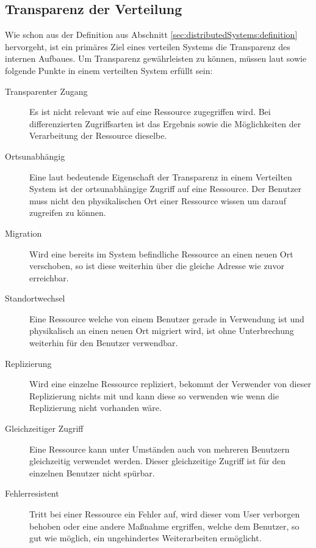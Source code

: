\subsection{Transparenz der Verteilung}\label{sec:distributedSystems:goales:Transperency} Wie schon aus der Definition aus Abschnitt \ref{sec:distributedSystems:definition} hervorgeht, ist ein primäres Ziel eines verteilen Systems die Transparenz des internen Aufbaues. Um Transparenz gewährleisten zu können, müssen laut \cite{iec1995open} sowie \cite{tanenbaum2007distributed} folgende Punkte in einem verteilten System erfüllt sein:
\begin{description}
    \item[Transparenter Zugang] Es ist nicht relevant wie auf eine Ressource zugegriffen wird. Bei differenzierten Zugriffsarten ist das Ergebnis sowie die Möglichkeiten der Verarbeitung der Ressource dieselbe. 
    \item[Ortsunabhängig] Eine laut \cite{tanenbaum2007distributed} bedeutende Eigenschaft der Transparenz in einem Verteilten System ist der ortsunabhängige Zugriff auf eine Ressource. Der Benutzer muss nicht den physikalischen Ort einer Ressource wissen um darauf zugreifen zu können. 
    \item[Migration] Wird eine bereits im System befindliche Ressource an einen neuen Ort verschoben, so ist diese weiterhin über die gleiche Adresse wie zuvor erreichbar.
    \item [Standortwechsel] Eine Ressource welche von einem Benutzer gerade in Verwendung ist und physikalisch an einen neuen Ort migriert wird, ist ohne Unterbrechung weiterhin für den Benutzer verwendbar.
    \item[Replizierung] Wird eine einzelne Ressource repliziert, bekommt der Verwender von dieser Replizierung nichts mit und kann diese so verwenden wie wenn die Replizierung nicht vorhanden wäre. 
    \item[Gleichzeitiger Zugriff] Eine Ressource kann unter Umständen auch von mehreren Benutzern gleichzeitig verwendet werden. Dieser gleichzeitige Zugriff ist für den einzelnen Benutzer nicht spürbar.
    \item[Fehlerresistent] Tritt bei einer Ressource ein Fehler auf, wird dieser vom User verborgen behoben oder eine andere Maßnahme ergriffen, welche dem Benutzer, so gut wie möglich, ein ungehindertes Weiterarbeiten ermöglicht.
% 
% 
\end{description}
